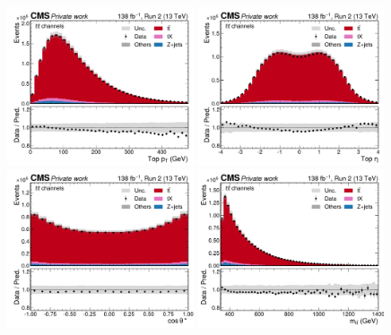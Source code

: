 \begin{figure}[!hp]
    \centering
    \includegraphics[width=0.49\textwidth]{figures/ah/controlplots/Reco/top_pt__ll.pdf}
    \hfill
    \includegraphics[width=0.49\textwidth]{figures/ah/controlplots/Reco/top_eta__ll.pdf}
    \includegraphics[width=0.49\textwidth]{figures/ah/controlplots/Reco/costhetastar__ll.pdf}
    \hfill
    \includegraphics[width=0.49\textwidth]{figures/ah/controlplots/Reco/mtt__ll.pdf}

\end{figure}
